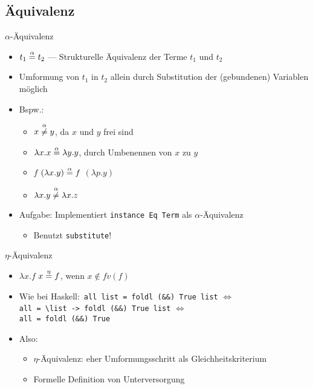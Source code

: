 \documentclass{beamer}
\begin{document}
\subsection{Äquivalenz}

\begin{frame}{$\alpha$-Äquivalenz}
	\begin{itemize}
		\item $t_1 \stackrel{\alpha}{=} t_2$ --- Strukturelle Äquivalenz der Terme $t_1$ und $t_2$
		\item Umformung von $t_1$ in $t_2$ allein durch Substitution der (gebundenen) Variablen möglich
		\pause
		\item Bspw.:
		\begin{itemize}
			\item $x \stackrel{\alpha}{\neq} y$, da $x$ und $y$ frei sind
			\item $\lambda{}x.x \stackrel{\alpha}{=} \lambda{}y.y$, durch Umbenennen von $x$ zu $y$
			\item $f$ $(\lambda{}x.y) \stackrel{\alpha}{=} f$ $(\lambda{}p.y)$
			\item $\lambda{}x.y \stackrel{\alpha}{\neq} \lambda{}x.z$
		\end{itemize}
		\pause
		\item Aufgabe: Implementiert \texttt{instance Eq Term} als $\alpha$-Äquivalenz
		\begin{itemize}
			\item Benutzt \texttt{substitute}!
		\end{itemize}
	\end{itemize}
\end{frame}

\begin{frame}{$\eta$-Äquivalenz}
	\begin{itemize}
		\item $\lambda{}x.f$ $x \stackrel{\eta}{=} f$, wenn $x \notin fv(f)$
		\item Wie bei Haskell:\
			\texttt{all list = foldl (\&\&) True list} $\Leftrightarrow$\\
			\texttt{all = \textbackslash{}list -> foldl (\&\&) True list} $\Leftrightarrow$\\
			\texttt{all = foldl (\&\&) True}
		\item Also:
		\begin{itemize}
			\item $\eta$-Äquivalenz: eher Umformungsschritt als Gleichheitskriterium
			\item Formelle Definition von Unterversorgung
		\end{itemize}
	\end{itemize}
\end{frame}
\end{document}
